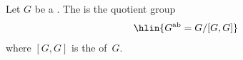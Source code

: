 \begin{definition} \label{definition:abelianization_of_a_group}
Let $G$ be a . The  is the quotient group
$$\hlin{G^{\operatorname{ab}} = G/[G,G]}$$
where $[G,G]$ is the  of~$G$.
\end{definition}
